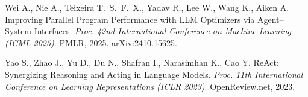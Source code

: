 \begin{citreflist}
\item Wei A., Nie A., Teixeira T.~S.~F.~X., Yadav R., Lee W., Wang K., Aiken A.
  Improving Parallel Program Performance with LLM Optimizers via Agent--System Interfaces.
  \textit{Proc. 42nd International Conference on Machine Learning (ICML 2025)}.
  PMLR, 2025.
  arXiv:2410.15625.

\item Yao S., Zhao J., Yu D., Du N., Shafran I., Narasimhan K., Cao Y.
  ReAct: Synergizing Reasoning and Acting in Language Models.
  \textit{Proc. 11th International Conference on Learning Representations (ICLR 2023)}.
  OpenReview.net, 2023.

\end{citreflist}
